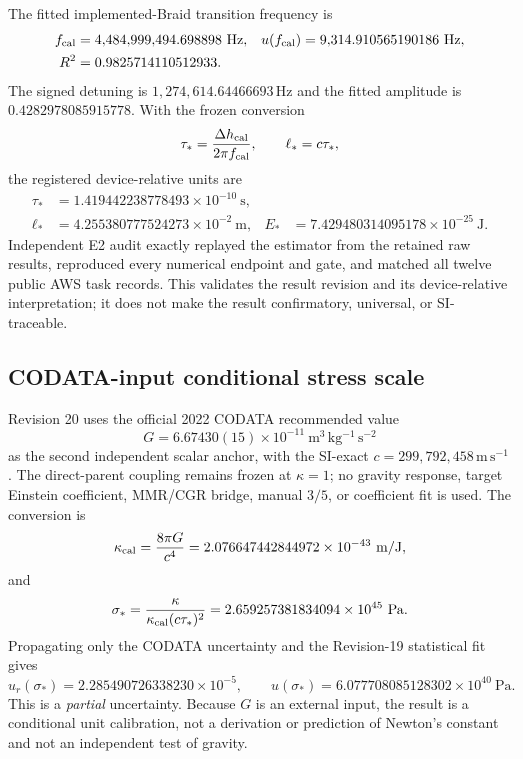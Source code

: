 \documentclass[11pt]{article}
\theoremstyle{definition}
\theoremstyle{remark}
\begin{document}
The fitted implemented-Braid transition frequency is
\begin{align}
 f_{\rm cal}&=4{,}484{,}999{,}494.698898\ \mathrm{Hz},
 &u(f_{\rm cal})&=9{,}314.910565190186\ \mathrm{Hz},\\
 R^2&=0.9825714110512933.
\end{align}
The signed detuning is $1,274,614.64466693\,\mathrm{Hz}$ and the fitted amplitude is $0.4282978085915778$. With the frozen conversion
\begin{equation}
 \tau_* = \frac{\Delta h_{\rm cal}}{2\pi f_{\rm cal}},
 \qquad \ell_*=c\tau_*,
\end{equation}
the registered device-relative units are
\begin{align}
 \tau_*&=1.419442238778493\times10^{-10}\ \mathrm{s},\\
 \ell_*&=4.255380777524273\times10^{-2}\ \mathrm{m},
 &E_*&=7.429480314095178\times10^{-25}\ \mathrm{J}.
\end{align}
Independent E2 audit exactly replayed the estimator from the retained raw results, reproduced every numerical endpoint and gate, and matched all twelve public AWS task records. This validates the result revision and its device-relative interpretation; it does not make the result confirmatory, universal, or SI-traceable.

\subsection{CODATA-input conditional stress scale}

Revision 20 uses the official 2022 CODATA recommended value
\begin{equation}
 G=6.67430(15)\times10^{-11}\ \mathrm{m^3\,kg^{-1}\,s^{-2}}
\end{equation}
as the second independent scalar anchor, with the SI-exact $c=299,792,458\,\mathrm{m\,s^{-1}}$ \cite{codata2022,bipmSI}. The direct-parent coupling remains frozen at $\kappa=1$; no gravity response, target Einstein coefficient, MMR/CGR bridge, manual $3/5$, or coefficient fit is used. The conversion is
\begin{equation}
 \kappa_{\rm cal}=\frac{8\pi G}{c^4}
 =2.076647442844972\times10^{-43}\ \mathrm{m/J},
\end{equation}
and
\begin{equation}
 \sigma_*=\frac{\kappa}{\kappa_{\rm cal}(c\tau_*)^2}
 =2.659257381834094\times10^{45}\ \mathrm{Pa}.
\end{equation}
Propagating only the CODATA uncertainty and the Revision-19 statistical fit gives
\begin{equation}
 u_r(\sigma_*)=2.285490726338230\times10^{-5},
 \qquad
 u(\sigma_*)=6.077708085128302\times10^{40}\ \mathrm{Pa}.
\end{equation}
This is a \emph{partial} uncertainty. Because $G$ is an external input, the result is a conditional unit calibration, not a derivation or prediction of Newton's constant and not an independent test of gravity.
\end{document}
